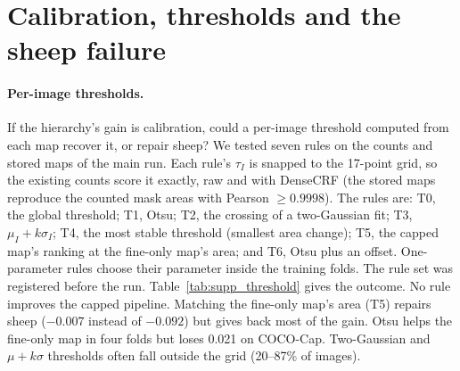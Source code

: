\section{Calibration, thresholds and the sheep failure}
\label{sec:supp_calibration}
\paragraph{Per-image thresholds.}
If the hierarchy's gain is calibration, could a per-image threshold computed from each map recover it, or repair sheep? We tested seven rules on the counts and stored maps of the main run. Each rule's $\tau_I$ is snapped to the 17-point grid, so the existing counts score it exactly, raw and with DenseCRF (the stored maps reproduce the counted mask areas with Pearson $\ge0.9998$). The rules are: T0, the global threshold; T1, Otsu; T2, the crossing of a two-Gaussian fit; T3, $\mu_I+k\sigma_I$; T4, the most stable threshold (smallest area change); T5, the capped map's ranking at the fine-only map's area; and T6, Otsu plus an offset. One-parameter rules choose their parameter inside the training folds. The rule set was registered before the run. Table~\ref{tab:supp_threshold} gives the outcome. No rule improves the capped pipeline. Matching the fine-only map's area (T5) repairs sheep ($-0.007$ instead of $-0.092$) but gives back most of the gain. Otsu helps the fine-only map in four folds but loses 0.021 on COCO-Cap. Two-Gaussian and $\mu{+}k\sigma$ thresholds often fall outside the grid (20--87\% of images).

